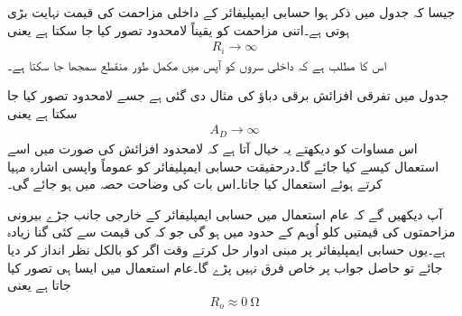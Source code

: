 
	جیسا کہ جدول  میں ذکر ہوا حسابی ایمپلیفائر کے داخلی مزاحمت کی قیمت نہایت بڑی ہوتی ہے۔اتنی مزاحمت کو یقیناً لامحدود تصور کیا جا سکتا ہے یعنی
\begin{align} \label{مساوات_حسابی_لامحدود_داخلی_مزاحمت}
R_i \to \infty
\end{align}
اس کا مطلب ہے کہ داخلی سروں کو آپس میں مکمل طور منقطع سمجھا جا سکتا ہے۔



جدول  میں تفرقی افزائش برقی دباؤ کی مثال  دی گئی ہے جسے لامحدود تصور کیا جا سکتا ہے یعنی
\begin{align}
A_D \to \infty
\end{align}
اس مساوات کو دیکھتے یہ خیال آتا ہے کہ لامحدود افزائش کی صورت میں اسے استعمال کیسے کیا جائے گا۔درحقیقت حسابی ایمپلیفائر کو عموماً واپسی اشارہ  مہیا کرتے ہوئے استعمال کیا جاتا۔اس بات کی وضاحت حصہ  میں ہو جائے گی۔


	
آپ دیکھیں گے کہ عام استعمال میں حسابی ایمپلیفائر کے خارجی جانب جڑے بیرونی مزاحمتوں کی قیمتیں کلو اُوہم   کے حدود میں ہو گی جو کہ   کی قیمت سے کئی گنا زیادہ ہے۔یوں حسابی ایمپلیفائر پر مبنی ادوار حل کرتے وقت اگر کو بالکل نظر انداز کر دیا جائے تو حاصل جواب پر خاص فرق نہیں پڑے گا۔عام استعمال میں ایسا ہی تصور کیا جاتا ہے یعنی
\begin{align} \label{مساوات_حسابی_صفر_خارجی_مزاحمت}
R_o \approx \SI{0}{\ohm}
\end{align}



